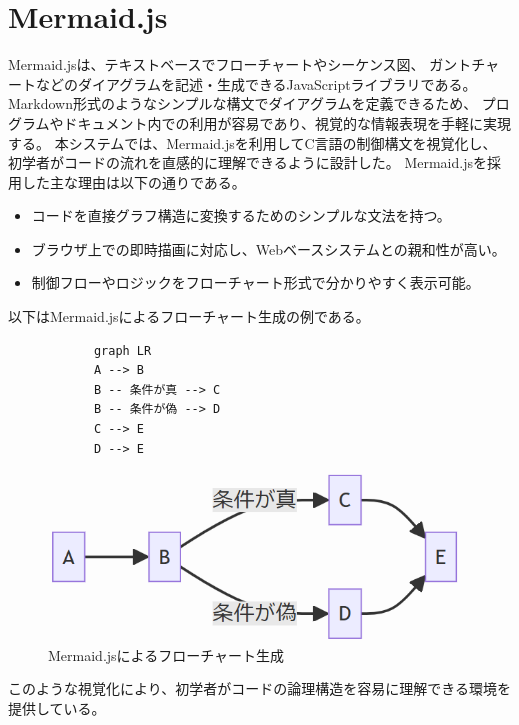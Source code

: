 \documentclass{cssspaper}
\begin{document}
        \section{Mermaid.js}
        Mermaid.jsは、テキストベースでフローチャートやシーケンス図、
        ガントチャートなどのダイアグラムを記述・生成できるJavaScriptライブラリである。
        Markdown形式のようなシンプルな構文でダイアグラムを定義できるため、
        プログラムやドキュメント内での利用が容易であり、視覚的な情報表現を手軽に実現する。
        本システムでは、Mermaid.jsを利用してC言語の制御構文を視覚化し、
        初学者がコードの流れを直感的に理解できるように設計した。
        Mermaid.jsを採用した主な理由は以下の通りである。
        \begin{itemize}
            \item コードを直接グラフ構造に変換するためのシンプルな文法を持つ。
            \item ブラウザ上での即時描画に対応し、Webベースシステムとの親和性が高い。
            \item 制御フローやロジックをフローチャート形式で分かりやすく表示可能。
        \end{itemize}
        以下はMermaid.jsによるフローチャート生成の例である。
        \begin{lstlisting}
            graph LR
            A --> B
            B -- 条件が真 --> C
            B -- 条件が偽 --> D
            C --> E
            D --> E
        \end{lstlisting}
        \begin{figure}[h]
            \centering
            \includegraphics[width=13cm]{mermaid.png}
            \caption{Mermaid.jsによるフローチャート生成}
            \label{fig:mermaid}
        \end{figure}

        このような視覚化により、初学者がコードの論理構造を容易に理解できる環境を提供している。
\end{document}
